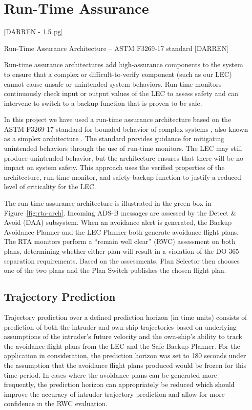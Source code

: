 \section{Run-Time Assurance}
\label{sec:rta}

[DARREN - 1.5 pg]

Run-Time Assurance Architecture -- ASTM F3269-17 standard [DARREN]

Run-time assurance architectures add high-assurance components
to the system to ensure that a complex or difficult-to-verify component (such as our LEC) cannot cause
unsafe or unintended system behaviors. Run-time monitors
continuously check input or output values of the LEC to assess safety and can intervene to
switch to a backup function that is proven to be safe. 

In this project we have used a
run-time assurance architecture based on the ASTM F3269-17
standard for bounded behavior of complex systems \cite{F3269-17}, also
known as a simplex architecture \cite{simplex}. The standard provides
guidance for mitigating unintended behaviors through the
use of run-time monitors. The LEC may still produce unintended
behavior, but the architecture ensures that there will
be no impact on system safety. This approach  uses
the verified properties of the architecture, run-time monitor,
and safety backup function to justify a reduced level of
criticality for the LEC.

The run-time assurance architecture is illustrated in the green box in Figure~\ref{fig:rta-arch}.  Incoming ADS-B messages are assessed by the Detect \& Avoid (DAA) subsystem.  When an avoidance alert is generated, the Backup Avoidance Planner and the LEC Planner both generate avoidance flight plans.  The RTA monitors perform a ``remain well clear'' (RWC) assessment on both plans, determining whether either plan will result in a violation of the DO-365 separation requirements.  Based on the assessments, Plan Selector then chooses one of the two plans and the Plan Switch publishes the chosen flight plan.

\subsection{Trajectory Prediction} 
Trajectory prediction over a defined prediction horizon (in time units) consists of prediction of both the intruder and own-ship trajectories based on underlying assumptions of the intruder's future velocity and the own-ship's ability to track the avoidance flight plans from the LEC and the Safe Backup Planner. For the application in consideration, the prediction horizon was set to 180 seconds under the assumption that the avoidance flight plans produced would be frozen for this time period. In cases where the avoidance plans can be generated more frequently, the prediction horizon can appropriately be reduced which should improve the accuracy of intruder trajectory prediction and allow for more confidence in the RWC evaluation.

